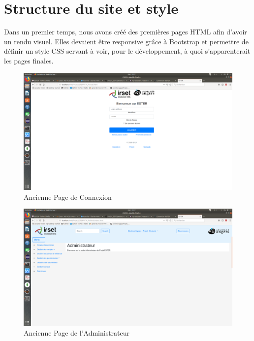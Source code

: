 \section{Structure du site et style}

Dans un premier temps, nous avons créé des premières pages HTML afin d'avoir un rendu visuel.
Elles devaient être responsive grâce à Bootstrap et permettre de définir un style CSS servant à voir, pour le développement, à quoi s'apparenterait les pages finales.

\begin{figure}[H]
    \begin{center}
	\includegraphics[scale=0.2,trim=4cm 0cm 4cm 5.3cm, clip=true]{img/OldConnexion}
    \end{center}
    \caption{Ancienne Page de Connexion}
\end{figure}

\begin{figure}[H]
    \begin{center}
	\includegraphics[scale=0.2,trim=2.8cm 0cm 0.8cm 5.3cm, clip=true]{img/OldAdmin}
    \end{center}
    \caption{Ancienne Page de l'Administrateur}
\end{figure}

